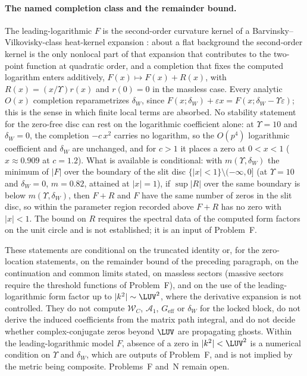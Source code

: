 \paragraph{The named completion class and the remainder bound.}
The leading-logarithmic \(F\) is the second-order curvature kernel
of a Barvinsky--Vilkovisky-class heat-kernel expansion
\cite{BarvinskyVilkovisky1990}: about a flat background the
second-order kernel is the only nonlocal part of that expansion
that contributes to the two-point function at quadratic order, and
a completion that fixes the computed logarithm enters additively,
\(F(x)\mapsto F(x)+R(x)\), with \(R(x)=(x/\Upsilon)r(x)\) and
\(r(0)=0\) in the massless case. Every analytic \(O(x)\) completion
reparametrizes \(\delta_W\), since
\(F(x;\delta_W)+\varepsilon x=F(x;\delta_W-\Upsilon\varepsilon)\);
this is the sense in which finite local terms are absorbed. No
stability statement for the zero-free disc can rest on the
logarithmic coefficient alone: at \(\Upsilon=10\) and
\(\delta_W=0\), the completion \(-c\,x^{2}\) carries no logarithm,
so the \(O(p^4)\) logarithmic coefficient and \(\delta_W\) are
unchanged, and for \(c>1\) it places a zero at \(0<x<1\)
(\(x\approx0.909\) at \(c=1.2\)). What is available is
conditional: with \(m(\Upsilon,\delta_W)\) the minimum of \(|F|\)
over the boundary of the slit disc
\(\{|x|<1\}\setminus(-\infty,0]\) (at \(\Upsilon=10\) and
\(\delta_W=0\), \(m=0.82\), attained at \(|x|=1\)), if
\(\sup|R|\) over the same boundary is below
\(m(\Upsilon,\delta_W)\), then \(F+R\) and \(F\) have the same
number of zeros in the slit disc, so within the parameter region
recorded above \(F+R\) has no zero with \(|x|<1\). The bound on
\(R\) requires the spectral data of the computed form factors on
the unit circle and is not established; it is an input of
Problem~F.


These statements are conditional on the truncated identity or, for
the zero-location statements, on the remainder bound of the preceding
paragraph, on the continuation and common limits stated, on massless
sectors (massive sectors require the threshold functions of Problem~F),
and on the use of the leading-logarithmic form factor up to
\(|k^2|\sim\LUV^2\), where the derivative expansion is not
controlled. They do not compute
\(\mathcal W_C\), \(\mathcal A_1\), \(G_{\mathrm{eff}}\) or \(\delta_W\)
for the locked block, do not derive the induced coefficients from the
matrix path integral, and do not decide whether complex-conjugate zeros
beyond \(\LUV\) are propagating ghosts. Within the leading-logarithmic
model \(F\), absence of a zero in \(|k^2|<\LUV^2\) is a numerical
condition on \(\Upsilon\) and \(\delta_W\), which are outputs of
Problem~F, and is not implied by the metric being composite.
Problems~F and~N remain open.

